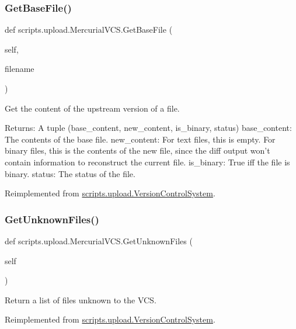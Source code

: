 \subsubsection{\texorpdfstring{GetBaseFile()}{GetBaseFile()}}
{\footnotesize\ttfamily def scripts.\+upload.\+Mercurial\+V\+C\+S.\+Get\+Base\+File (\begin{DoxyParamCaption}\item[{}]{self,  }\item[{}]{filename }\end{DoxyParamCaption})}

\begin{DoxyVerb}Get the content of the upstream version of a file.

Returns:
  A tuple (base_content, new_content, is_binary, status)
base_content: The contents of the base file.
new_content: For text files, this is empty.  For binary files, this is
  the contents of the new file, since the diff output won't contain
  information to reconstruct the current file.
is_binary: True iff the file is binary.
status: The status of the file.
\end{DoxyVerb}
 

Reimplemented from \mbox{\hyperlink{classscripts_1_1upload_1_1_version_control_system_ae50b1c259d0f1e12e855a142c8ee04e4}{scripts.\+upload.\+Version\+Control\+System}}.

\mbox{\label{classscripts_1_1upload_1_1_mercurial_v_c_s_ac8cd9647f5029dc05a0584cfb9933a6a}} 
\subsubsection{\texorpdfstring{GetUnknownFiles()}{GetUnknownFiles()}}
{\footnotesize\ttfamily def scripts.\+upload.\+Mercurial\+V\+C\+S.\+Get\+Unknown\+Files (\begin{DoxyParamCaption}\item[{}]{self }\end{DoxyParamCaption})}

\begin{DoxyVerb}Return a list of files unknown to the VCS.\end{DoxyVerb}
 

Reimplemented from \mbox{\hyperlink{classscripts_1_1upload_1_1_version_control_system_a622bbb4e8be9c1cdfde8aa1af1f7f553}{scripts.\+upload.\+Version\+Control\+System}}.



